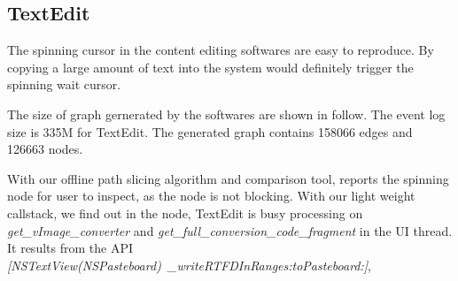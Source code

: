 \subsection{TextEdit}
The spinning cursor in the content editing softwares are easy to reproduce.
By copying a large amount of text into the system would definitely trigger
the spinning wait cursor.

The size of graph gernerated by the softwares are shown in follow.
The event log size is 335M for TextEdit.
The generated graph contains 158066 edges and 126663 nodes.

With our offline path slicing algorithm and comparison tool,
\xxx reports the spinning node for user to inspect, as the node is
not blocking.
With our light weight callstack, we find out in the node,
TextEdit is busy processing on \textit{get\_vImage\_converter}
and \textit{get\_full\_conversion\_code\_fragment} in the UI thread.
It results from the API \textit{[NSTextView(NSPasteboard)\ \_writeRTFDInRanges:toPasteboard:]},


